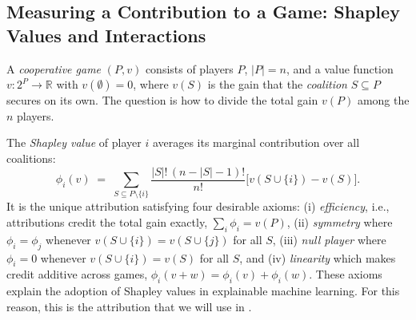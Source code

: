 \subsection{Measuring a Contribution to a Game: Shapley Values and Interactions}
\label{sec:prelim-shapley}

A \emph{cooperative game} $(P, v)$ consists of players $P$, $|P| = n$, and a
value function $v : 2^{P} \to \mathbb{R}$ with $v(\emptyset) = 0$, where $v(S)$
is the gain that the \emph{coalition} $S \subseteq P$ secures on its own. The
question is how to divide the total gain $v(P)$ among the $n$ players.

The \emph{Shapley value}
\citep{shapley1953value} of player $i$ averages its marginal
contribution over all coalitions:
\begin{equation}
\label{eq:shapley}
\phi_i(v) \;=\; \sum_{S \subseteq P \setminus \{i\}}
  \frac{|S|!\,(n - |S| - 1)!}{n!}
  \bigl[v(S \cup \{i\}) - v(S)\bigr].
\end{equation}
It is the unique attribution satisfying four desirable axioms: (i) \emph{efficiency}, i.e., attributions credit
the total gain exactly, $\sum_i \phi_i = v(P)$, (ii) \emph{symmetry} where $\phi_i = \phi_j$
whenever $v(S \cup \{i\}) = v(S \cup \{j\})$ for all $S$, (iii) \emph{null player}
where $\phi_i = 0$
whenever $v(S \cup \{i\}) = v(S)$ for all $S$, and (iv) \emph{linearity} which makes credit
additive across games, $\phi_i(v + w) = \phi_i(v) + \phi_i(w)$. These axioms
explain the adoption of Shapley values in explainable machine learning. For this reason, this is the attribution that we will use in \method.
